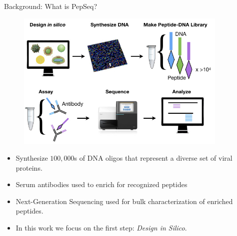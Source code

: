 \documentclass[final]{beamer}
\newlength{\sepwidth}
\newlength{\colwidth}
\newcommand{\separatorcolumn}{\begin{column}{\sepwidth}\end{column}}
\begin{document}
\begin{frame}[t]
\begin{columns}[t]
\begin{column}{\colwidth}
  \begin{block}{Background: What is PepSeq?}
    \begin{figure}
      \includegraphics[width=0.6\colwidth]{figures/Overview.jpeg}
      \label{fig:library}
    \end{figure}
    \begin{itemize}
    \item Synthesize $100,000$s of DNA oligos that represent a diverse set of viral proteins.
    \item Serum antibodies used to enrich for recognized peptides
    \item Next-Generation Sequencing used for bulk characterization of enriched peptides.
    \item In this work we focus on the first step: \emph{Design in Silico}.

    \end{itemize}
  \end{block}
\end{column}

\separatorcolumn



\begin{column}{\colwidth}


\end{column}
\end{columns}
\end{frame}
\end{document}
